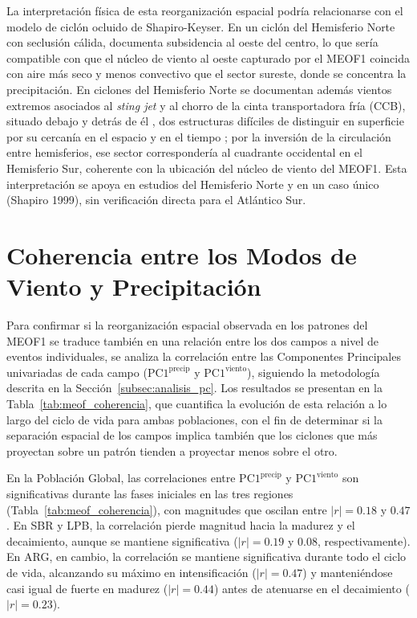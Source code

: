 La interpretación física de esta reorganización espacial podría relacionarse con el modelo de ciclón ocluido de Shapiro-Keyser. En un ciclón del Hemisferio Norte con seclusión cálida, \citet{shapiro1999bridge} documenta subsidencia al oeste del centro, lo que sería compatible con que el núcleo de viento al oeste capturado por el MEOF1 coincida con aire más seco y menos convectivo que el sector sureste, donde se concentra la precipitación. En ciclones del Hemisferio Norte se documentan además vientos extremos asociados al \textit{sting jet} y al chorro de la cinta transportadora fría (CCB), situado debajo y detrás de él \citep{clark2005sting, clark2018sting}, dos estructuras difíciles de distinguir en superficie por su cercanía en el espacio y en el tiempo \citep{eisenstein2023identification}; por la inversión de la circulación entre hemisferios, ese sector correspondería al cuadrante occidental en el Hemisferio Sur, coherente con la ubicación del núcleo de viento del MEOF1. Esta interpretación se apoya en estudios del Hemisferio Norte y en un caso único (Shapiro 1999), sin verificación directa para el Atlántico Sur.

\section{Coherencia entre los Modos de Viento y Precipitación}
\label{sec:meof_coherencia}

Para confirmar si la reorganización espacial observada en los patrones del MEOF1 se traduce también en una relación entre los dos campos a nivel de eventos individuales, se analiza la correlación entre las Componentes Principales univariadas de cada campo ($\text{PC1}^{\text{precip}}$ y $\text{PC1}^{\text{viento}}$), siguiendo la metodología descrita en la Sección~\ref{subsec:analisis_pc}. Los resultados se presentan en la Tabla~\ref{tab:meof_coherencia}, que cuantifica la evolución de esta relación a lo largo del ciclo de vida para ambas poblaciones, con el fin de determinar si la separación espacial de los campos implica también que los ciclones que más proyectan sobre un patrón tienden a proyectar menos sobre el otro.



En la Población Global, las correlaciones entre $\text{PC1}^{\text{precip}}$ y $\text{PC1}^{\text{viento}}$ son significativas durante las fases iniciales en las tres regiones (Tabla~\ref{tab:meof_coherencia}), con magnitudes que oscilan entre $|r|=0.18$ y $0.47$. En SBR y LPB, la correlación pierde magnitud hacia la madurez y el decaimiento, aunque se mantiene significativa ($|r|=0.19$ y $0.08$, respectivamente). En ARG, en cambio, la correlación se mantiene significativa durante todo el ciclo de vida, alcanzando su máximo en intensificación ($|r|=0.47$) y manteniéndose casi igual de fuerte en madurez ($|r|=0.44$) antes de atenuarse en el decaimiento ($|r|=0.23$).

